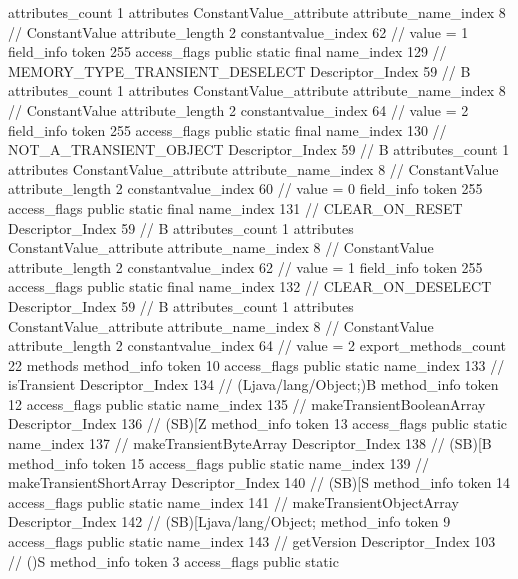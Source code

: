 {{{{{				attributes_count	1
				attributes {
				ConstantValue_attribute {
					attribute_name_index	8		// ConstantValue
					attribute_length	2
					constantvalue_index	62		// value = 1
				}
				}
			}
			field_info {
				token	255
				access_flags	public static final
				name_index	129		// MEMORY_TYPE_TRANSIENT_DESELECT
				Descriptor_Index	59		// B
				attributes_count	1
				attributes {
				ConstantValue_attribute {
					attribute_name_index	8		// ConstantValue
					attribute_length	2
					constantvalue_index	64		// value = 2
				}
				}
			}
			field_info {
				token	255
				access_flags	public static final
				name_index	130		// NOT_A_TRANSIENT_OBJECT
				Descriptor_Index	59		// B
				attributes_count	1
				attributes {
				ConstantValue_attribute {
					attribute_name_index	8		// ConstantValue
					attribute_length	2
					constantvalue_index	60		// value = 0
				}
				}
			}
			field_info {
				token	255
				access_flags	public static final
				name_index	131		// CLEAR_ON_RESET
				Descriptor_Index	59		// B
				attributes_count	1
				attributes {
				ConstantValue_attribute {
					attribute_name_index	8		// ConstantValue
					attribute_length	2
					constantvalue_index	62		// value = 1
				}
				}
			}
			field_info {
				token	255
				access_flags	public static final
				name_index	132		// CLEAR_ON_DESELECT
				Descriptor_Index	59		// B
				attributes_count	1
				attributes {
				ConstantValue_attribute {
					attribute_name_index	8		// ConstantValue
					attribute_length	2
					constantvalue_index	64		// value = 2
				}
				}
			}
			}
			export_methods_count	22
			methods {
				method_info {
					token	10
					access_flags	public static
					name_index	133		// isTransient
					Descriptor_Index	134		// (Ljava/lang/Object;)B
				}
				method_info {
					token	12
					access_flags	public static
					name_index	135		// makeTransientBooleanArray
					Descriptor_Index	136		// (SB)[Z
				}
				method_info {
					token	13
					access_flags	public static
					name_index	137		// makeTransientByteArray
					Descriptor_Index	138		// (SB)[B
				}
				method_info {
					token	15
					access_flags	public static
					name_index	139		// makeTransientShortArray
					Descriptor_Index	140		// (SB)[S
				}
				method_info {
					token	14
					access_flags	public static
					name_index	141		// makeTransientObjectArray
					Descriptor_Index	142		// (SB)[Ljava/lang/Object;
				}
				method_info {
					token	9
					access_flags	public static
					name_index	143		// getVersion
					Descriptor_Index	103		// ()S
				}
				method_info {
					token	3
					access_flags	public static
}}}}}
